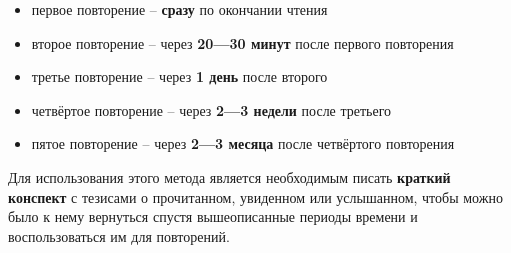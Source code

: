 \documentclass[12pt]{article}			%
\begin{document}
\begin{outline}[enumerate]
\begin{itemize}
	\item первое повторение -- \textbf{сразу} по окончании чтения
	\item второе повторение -- через \textbf{20—30 минут} после первого повторения
	\item третье повторение -- через \textbf{1 день} после второго
	\item четвёртое повторение -- через \textbf{2—3 недели} после третьего
	\item пятое повторение -- через \textbf{2—3 месяца} после четвёртого повторения
\end{itemize}

Для использования этого метода является необходимым писать \textbf{краткий конспект} с тезисами о прочитанном, увиденном или услышанном, чтобы можно было к нему вернуться спустя вышеописанные периоды времени и воспользоваться им для повторений.
\end{outline}
\end{document}
